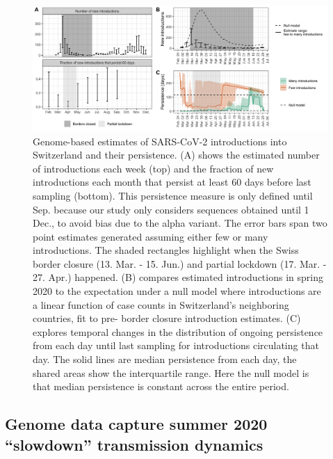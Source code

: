 \documentclass[11pt,twoside,lineno]{pnas-new} %
\begin{document}
\begin{figure}[H]
\centering
\includegraphics[width=\linewidth]{figures/introductions_and_persistence_v2.png}
\caption{Genome-based estimates of SARS-CoV-2 introductions into Switzerland and their persistence. (A) shows the estimated number of introductions each week (top) and the fraction of new introductions each month that persist at least 60 days before last sampling (bottom). This persistence measure is only defined until Sep. because our study only considers sequences obtained until 1 Dec., to avoid bias due to the alpha variant. The error bars span two point estimates generated assuming either few or many introductions. The shaded rectangles highlight when the Swiss border closure (13. Mar. - 15. Jun.) and partial lockdown (17. Mar. - 27. Apr.) happened. (B) compares estimated introductions in spring 2020 to the expectation under a null model where introductions are a linear function of case counts in Switzerland's neighboring countries, fit to pre- border closure introduction estimates. (C) explores temporal changes in the distribution of ongoing persistence from each day until last sampling for introductions circulating that day. The solid lines are median persistence from each day, the shared areas show the interquartile range. Here the null model is that median persistence is constant across the entire period.}
\label{fig:chain-longevity}
\end{figure}

\subsection{Genome data capture summer 2020 ``slowdown'' transmission dynamics}
\end{document}
